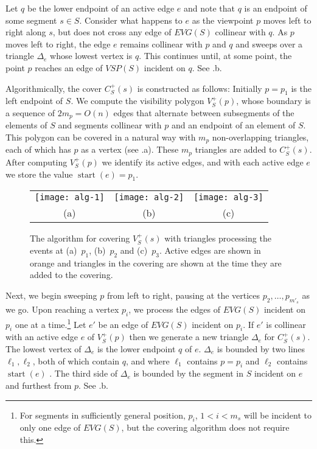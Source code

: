 \documentclass{patmorin}
\newcommand{\EVG}{\mathit{EVG}}
\newcommand{\VSP}{\mathit{VSP}}
\DeclareMathOperator{\start}{start}
\begin{document}
Let $q$ be the lower endpoint of an active edge $e$ and note that $q$
is an endpoint of some segment $s\in S$. Consider what happens to $e$
as the viewpoint $p$ moves left to right along $s$, but does not cross
any edge of $\EVG(S)$ collinear with $q$.  As $p$ moves left to right,
the edge $e$ remains collinear with $p$ and $q$ and sweeps over a
triangle $\Delta_e$ whose lowest vertex is $q$.  This continues until,
at some point, the point $p$ reaches an edge of $\VSP(S)$ incident on $q$.
See .b.

Algorithmically, the cover $C^+_S(s)$ is constructed as follows: Initially
$p=p_1$ is the left endpoint of $S$.  We compute the visibility polygon
$V^+_S(p)$, whose boundary is a sequence of $2m_p=O(n)$ edges that alternate
between subsegments of the elements of $S$ and segments collinear with $p$
and an endpoint of an element of $S$.  This polygon can be covered in a
natural way with $m_p$ non-overlapping triangles, each of which has $p$
as a vertex (see .a). These $m_p$ triangles are added to
$C^+_S(s)$.  After computing $V^+_S(p)$ we identify its active edges, and with
each active edge $e$ we store the value $\start(e)=p_1$.

\begin{figure}
  \begin{center}
    \begin{tabular}{ccc}
      \texttt{[image: alg-1]} &
      \texttt{[image: alg-2]} &
      \texttt{[image: alg-3]} \\
      (a) & (b) & (c)
    \end{tabular}
  \end{center}
  \caption{The algorithm for covering $V^+_S(s)$ with triangles processing
           the events at (a)~$p_1$, (b)~$p_2$ and (c)~$p_3$.  
           Active edges are shown in orange and triangles in the covering
are shown at the time they are added to the covering.}
\end{figure}

Next, we begin sweeping $p$ from left to right, pausing at the vertices
$p_2,\ldots,p_{m'_s}$ as we go.  Upon reaching a vertex $p_i$, we process
the edges of $\EVG(S)$ incident on $p_i$ one at a time.\footnote{For
segments in sufficiently general position, $p_i$, $1<i<m_s$ will be
incident to only one edge of $\EVG(S)$, but the covering algorithm does not
require this.}  Let $e'$ be an edge of $\EVG(S)$ incident on $p_i$. If $e'$
is collinear with an active edge $e$ of $V^+_S(p)$ then we generate a new
triangle $\Delta_e$ for $C^+_S(s)$.  The lowest vertex of $\Delta_e$ is the
lower endpoint $q$ of $e$. $\Delta_e$ is bounded by two lines
$\ell_1,\ell_2$, both of which contain $q$, and where $\ell_1$ contains
$p=p_i$ and $\ell_2$ contains $\start(e)$ .  The third side of $\Delta_e$
is bounded by the segment in $S$ incident on $e$ and furthest from $p$. See
.b.
\end{document}
